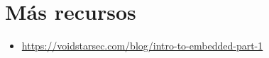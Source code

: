 \documentclass[12pt,a4paper, brazil]{article}
\begin{document}
\section{Más recursos}

\begin{tcolorbox}[enhanced, dropshadow, title=Reversing a tope, colback=blue!10]
    \begin{itemize}
        \item \href{Introducción a la ingeniería inversa en dispositivos empotrados.}{https://voidstarsec.com/blog/intro-to-embedded-part-1}
    \end{itemize}
    
\end{tcolorbox}



\printbibliography
\end{document}
